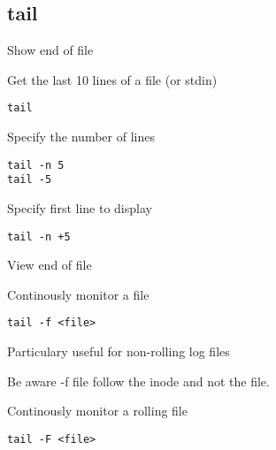 \subsection{tail}

\begin{frame}[fragile]{Show end of file}
  \begin{exampleblock}{Get the last 10 lines of a file (or stdin)}
    \begin{lstlisting}[showstringspaces=false,basicstyle=\tiny]
tail
    \end{lstlisting}
  \end{exampleblock}

  \pause
  \begin{exampleblock}{Specify the number of lines}
    \begin{lstlisting}[showstringspaces=false,basicstyle=\tiny]
tail -n 5
tail -5
    \end{lstlisting}
  \end{exampleblock}

  \pause
  \begin{exampleblock}{Specify first line to display}
    \begin{lstlisting}[showstringspaces=false,basicstyle=\tiny]
tail -n +5
    \end{lstlisting}
  \end{exampleblock}
\end{frame}


\begin{frame}[fragile]{View end of file}
  \begin{exampleblock}{Continously monitor a file}
    \begin{lstlisting}[showstringspaces=false,basicstyle=\tiny]
tail -f <file>
    \end{lstlisting}
  \end{exampleblock}
Particulary useful for non-rolling log files
\pause

Be aware -f file follow the inode and not the file.

  \pause
  \begin{exampleblock}{Continously monitor a rolling file}
    \begin{lstlisting}[showstringspaces=false,basicstyle=\tiny]
tail -F <file>
    \end{lstlisting}
  \end{exampleblock}


\end{frame}

